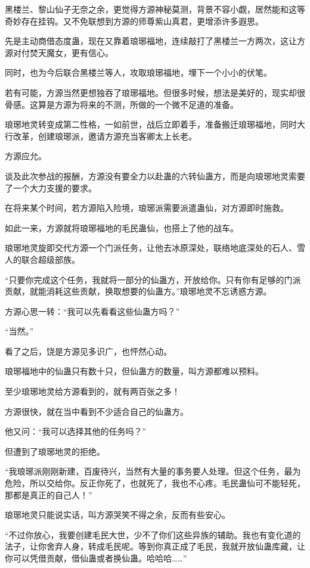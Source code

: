 \begin{this_body}
黑楼兰、黎山仙子无奈之余，更觉得方源神秘莫测，背景不容小觑，居然能和这等奇妙存在挂钩。又不免联想到方源的师尊紫山真君，更增添许多遐思。

先是主动商借态度蛊，现在又靠着琅琊福地，连续敲打了黑楼兰一方两次，这让方源对付焚天魔女，更有信心。

同时，也为今后联合黑楼兰等人，攻取琅琊福地，埋下一个小小的伏笔。

若有可能，方源当然更想独吞了琅琊福地。但很多时候，想法是美好的，现实却很骨感。这算是方源为将来的不测，所做的一个微不足道的准备。

琅琊地灵转变成第二性格，一如前世，战后立即着手，准备搬迁琅琊福地，同时大行改革，创建琅琊派，邀请方源充当客卿太上长老。

方源应允。

谈及此次参战的报酬，方源没有要全力以赴蛊的六转仙蛊方，而是向琅琊地灵索要了一个大力支援的要求。

在将来某个时间，若方源陷入险境，琅琊派需要派遣蛊仙，对方源即时施救。

如此一来，方源就将琅琊福地的毛民蛊仙，也搭上了他的战车。

琅琊地灵旋即交代方源一个门派任务，让他去冰原深处，联络地底深处的石人、雪人的联合超级部族。

“只要你完成这个任务，我就将一部分的仙蛊方，开放给你。只有你有足够的门派贡献，就能消耗这些贡献，换取想要的仙蛊方。”琅琊地灵不忘诱惑方源。

方源心思一转：“我可以先看看这些仙蛊方吗？”

“当然。”

看了之后，饶是方源见多识广，也怦然心动。

琅琊福地中的仙蛊只有数十只，但仙蛊方的数量，叫方源都难以预料。

至少琅琊地灵给方源看到的，就有两百张之多！

方源很快，就在当中看到不少适合自己的仙蛊方。

他又问：“我可以选择其他的任务吗？”

但遭到了琅琊地灵的拒绝。

“我琅琊派刚刚新建，百废待兴，当然有大量的事务要人处理。但这个任务，最为危险，所以交给你。反正你死了，也就死了，我也不心疼。毛民蛊仙可不能轻死，那都是真正的自己人！”

琅琊地灵只能说实话，叫方源哭笑不得之余，反而有些安心。

“不过你放心，我要创建毛民大世，少不了你们这些异族的辅助。我也有变化道的法子，让你舍弃人身，转成毛民呢。等到你真正成了毛民，我就开放仙蛊库藏，让你可以凭借贡献，借仙蛊或者换仙蛊。哈哈哈……”


\end{this_body}
